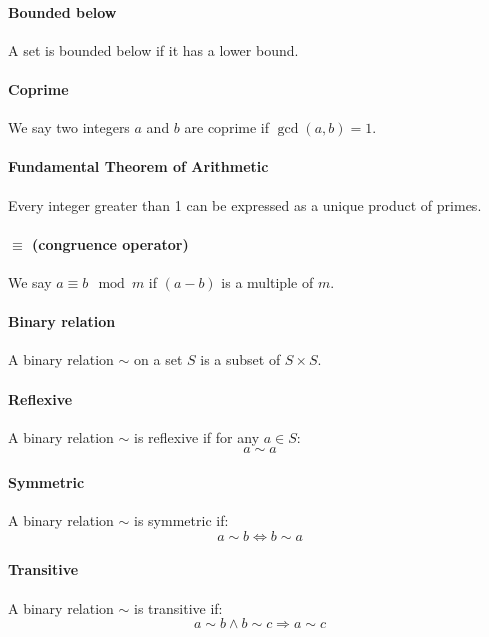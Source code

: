 \documentclass{scrartcl}
\begin{document}
\paragraph{Bounded below}
A set is bounded below if it has a lower bound.

\paragraph{Coprime}
We say two integers $ a $ and $ b $ are coprime if $ \gcd(a, b) = 1 $.

\paragraph{Fundamental Theorem of Arithmetic}
Every integer greater than 1 can be expressed as a unique product of primes.

\paragraph{$ \equiv$ (congruence operator)}
We say $ a \equiv b \mod m $ if $ (a - b) $ is a multiple of $ m $.

\paragraph{Binary relation}
A binary relation $ \sim $ on a set $ S $ is a subset of $ S \times S $.

\paragraph{Reflexive}
A binary relation $ \sim $ is reflexive if for any $ a \in S $:
\begin{equation}
a \sim a
\end{equation}

\paragraph{Symmetric}
A binary relation $ \sim $ is symmetric if:
\begin{equation}
a \sim b \Leftrightarrow b \sim a
\end{equation}

\paragraph{Transitive}
A binary relation $ \sim $ is transitive if:
\begin{equation}
a \sim b \land b \sim c \Rightarrow a \sim c
\end{equation}
\end{document}
